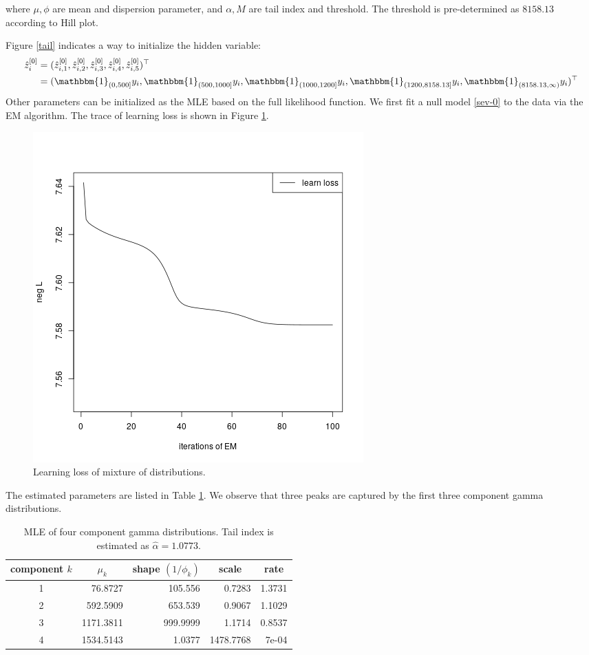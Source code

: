 \documentclass[11pt]{article}
\numberwithin{equation}{section}
\begin{document}
	where $\mu,\phi$ are mean and dispersion parameter, and $\alpha, M$ are tail index and threshold. The threshold is pre-determined as $8158.13$ according to Hill plot.
	
	Figure \ref{tail} indicates a way to initialize the hidden variable:
	\begin{equation}
		\begin{aligned}
			\hat{z}^{[0]}_i&=(\hat{z}^{[0]}_{i,1},\hat{z}^{[0]}_{i,2},\hat{z}^{[0]}_{i,3},\hat{z}^{[0]}_{i,4},\hat{z}^{[0]}_{i,5})^\top\\
			&=(\mathbbm{1}_{(0,500]}y_i,\mathbbm{1}_{(500, 1000]}y_i,\mathbbm{1}_{(1000,1200]}y_i,\mathbbm{1}_{(1200,8158.13]}y_i,\mathbbm{1}_{(8158.13,\infty)}y_i)^\top
		\end{aligned}
	\end{equation}
	Other parameters can be initialized as the MLE based on the full likelihood function.
We first fit a null model \eqref{sev-0} to the data via the EM algorithm. 
The trace of learning loss is shown in Figure \ref{null_sev}.
	\begin{figure}[h!]
		\centering
		\includegraphics[width=0.5\linewidth]{../plots/sev/null_trace}
		\caption{Learning loss of mixture of distributions.}\label{null_sev}
	\end{figure}
The estimated parameters are listed in Table \ref{null-gamma}. We observe that three peaks are captured by the first three component gamma distributions.
	\begin{table}[h!]
		\centering
		\caption{MLE of four component gamma distributions. Tail index is estimated as $\hat{\alpha}=1.0773$.}\label{null-gamma}
		\begin{tabular}{crrrr}
			\hline
			component $k$ & \multicolumn{1}{c}{$\mu_k$} & \multicolumn{1}{c}{shape $(1/\phi_k)$} & \multicolumn{1}{c}{scale} & \multicolumn{1}{c}{rate} \\ \hline
			1         & 76.8727                & 105.556                   & 0.7283                    & 1.3731                   \\
			2         & 592.5909               & 653.539                   & 0.9067                    & 1.1029                   \\
			3         & 1171.3811              & 999.9999                  & 1.1714                    & 0.8537                   \\
			4         & 1534.5143              & 1.0377                    & 1478.7768                 & 7e-04                    \\ \hline
		\end{tabular}
	\end{table}
\end{document}
